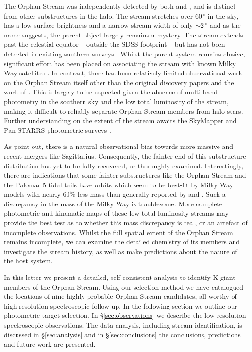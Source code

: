 \documentclass{emulateapj}
\begin{document}
The Orphan Stream was independently detected by both \citet{Grillmair;Dionatos_2006} and \citet{Belokurov;et-al_2006}, and is distinct from other substructures in the halo. The stream stretches over $60\,^\circ$ in the sky, has a low surface brightness and a narrow stream width of only $\sim$2\,$^\circ$ and as the name suggests, the parent object largely remains a mystery. The stream extends past the celestial equator \--- outside the SDSS footprint \--- but has not been detected in existing southern surveys \citep{Newberg;et-al_2010}. Whilst the parent system remains elusive, significant effort has been placed on associating the stream with known Milky Way satellites \citep{Zucker;et-al_2006, Fellhaur;et-al_2007,Jin;Lynden_Bell_2007,Sales;et-al_2008}. In contrast, there has been relatively limited observational work on the Orphan Stream itself other than the original discovery papers \citep{Grillmair;Dionatos_2006, Belokurov;et-al_2006, Belokurov;et-al_2007} and the work of \citet{Newberg;et-al_2010}. This is largely to be expected given the absence of multi-band photometry in the southern sky and the low total luminosity of the stream, making it difficult to reliably separate Orphan Stream members from halo stars. Further understanding on the extent of the stream awaits the SkyMapper and Pan-STARRS photometric surveys \citep{Keller;et-al_2007, Hodapp;et-al_2004}.

As \citet{Sales;et-al_2008} point out, there is a natural observational bias towards more massive and recent mergers like Sagittarius. Consequently, the fainter end of this substructure distribution has yet to be fully recovered, or thoroughly examined. Interestingly, there are indications that  some fainter substructures like the Orphan Stream and the Palomar 5 tidal tails \citep{Odenkirchen;et-al_2009} have orbits which seem to be best-fit by Milky Way models with nearly 60\% less mass \citep{Newberg;et-al_2010} than generally reported by \citet{Xue;et-al_2008} and \citet{Koposov;et-al_2010}. Such a discrepancy in the mass of the Milky Way is troublesome. More complete photometric and kinematic maps of these low total luminosity streams may provide the best test as to whether this mass discrepancy is real, or an artefact of incomplete observations. Whilst the full spatial extent of the Orphan Stream remains incomplete, we can examine the detailed chemistry of its members and investigate the stream history, as well as make predictions about the nature of the host system.

In this letter we present a detailed, self-consistent analysis to identify K giant members of the Orphan Stream. Using our selection method we have catalogued the locations of nine highly probable Orphan Stream candidates, all worthy of high-resolution spectroscopic follow up. In the following section we outline our photometric target selection. In \S\ref{sec:observations} we describe the low-resolution spectroscopic observations. The data analysis, including stream identification, is discussed in \S\ref{sec:analysis} and in \S\ref{sec:conclusions} the conclusions, predictions and future work are presented.
\end{document}
